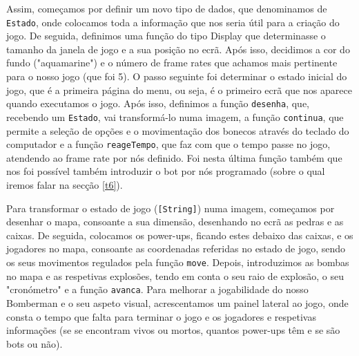 \documentclass[a4paper]{article}
\begin{document}
Assim, começamos por definir um novo tipo de dados, que denominamos de \texttt{Estado}, onde colocamos toda a informação que nos seria útil para a criação do jogo. De seguida, definimos uma função do tipo Display que determinasse o tamanho da janela de jogo e a sua posição no ecrã. Após isso, decidimos a cor do fundo ("aquamarine") e o número de frame rates que achamos mais pertinente para o nosso jogo (que foi 5). O passo seguinte foi determinar o estado inicial do jogo, que é a primeira página do menu, ou seja, é o primeiro ecrã que nos aparece quando executamos o jogo. Após isso, definimos a função \texttt {desenha}, que, recebendo um \texttt{Estado}, vai transformá-lo numa imagem, a função \texttt{continua}, que permite a seleção de opções e o movimentação dos bonecos através do teclado do computador e a função \texttt{reageTempo}, que faz com que o tempo passe no jogo, atendendo ao frame rate por nós definido. Foi nesta última função também que nos foi possível também introduzir o bot por nós programado (sobre o qual iremos falar na secção \ref{t6}).

Para transformar o estado de jogo (\texttt{[String]}) numa imagem, começamos por desenhar o mapa, consoante a sua dimensão, desenhando no ecrã as pedras e as caixas. De seguida, colocamos os power-ups, ficando estes debaixo das caixas, e os jogadores no mapa, consoante as coordenadas referidas no estado de jogo, sendo os seus movimentos regulados pela função \texttt{move}. Depois, introduzimos as bombas no mapa e as respetivas explosões, tendo em conta o seu raio de explosão, o seu "cronómetro" e a função \texttt{avanca}. Para melhorar a jogabilidade do nosso Bomberman e o seu aspeto visual, acrescentamos um painel lateral ao jogo, onde consta o tempo que falta para terminar o jogo e os jogadores e respetivas informações (se se encontram vivos ou mortos, quantos power-ups têm e se são bots ou não).
\end{document}
